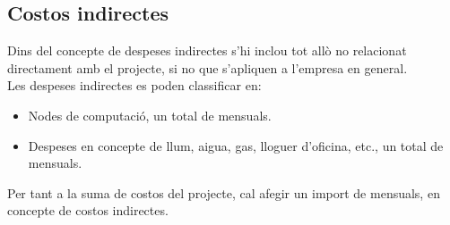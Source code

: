 \subsection{Costos indirectes}
Dins del concepte de despeses indirectes s'hi inclou tot allò no relacionat directament amb el projecte, si no que s'apliquen a l'empresa en general.\\
Les despeses indirectes es poden classificar en:
\begin{itemize}
    \item Nodes de computació, un total de  mensuals.
    \item Despeses en concepte de llum, aigua, gas, lloguer d'oficina, etc., un total de  mensuals.
\end{itemize}
\newline Per tant a la suma de costos del projecte, cal afegir un import de \textbf{} mensuals, en concepte de costos indirectes.
